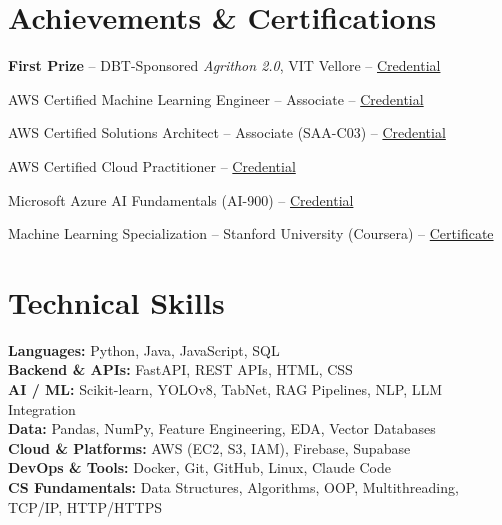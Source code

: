 \documentclass[letterpaper,10.5pt]{article}
\begin{document}
\section{Achievements \& Certifications}
\begin{itemize}[leftmargin=0.15in, label={}, itemsep=1pt]
\small{
\item \textbf{First Prize} -- DBT-Sponsored \textit{Agrithon 2.0}, VIT Vellore -- \href{https://drive.google.com/file/d/12WI3zcQ_F4nXMRPHarrw1WI0uNkJj36C/view?usp=sharing}{Credential}
\item AWS Certified Machine Learning Engineer -- Associate -- \href{https://www.credly.com/badges/0ad4ecf8-45d0-438b-80ff-40d844e00556/public_url}{Credential}
\item AWS Certified Solutions Architect -- Associate (SAA-C03) -- \href{https://www.credly.com/badges/f464bb37-b9c3-4797-a5a9-1394163c2cb1/public_url}{Credential}
\item AWS Certified Cloud Practitioner -- \href{https://www.credly.com/badges/4b11c745-20e2-41c8-b481-8e084f991dba}{Credential}
\item Microsoft Azure AI Fundamentals (AI-900) -- \href{https://learn.microsoft.com/en-us/users/hariharans-2887/credentials/e15dbe931e8ce668}{Credential}
\item Machine Learning Specialization -- Stanford University (Coursera) -- \href{https://www.coursera.org/account/accomplishments/specialization/XDCVA2K1C5GX}{Certificate}
}
\end{itemize}

\section{Technical Skills}
\begin{itemize}[leftmargin=0.15in, label={}]
\small{
\item{
\textbf{Languages:} Python, Java, JavaScript, SQL \\
\textbf{Backend \& APIs:} FastAPI, REST APIs, HTML, CSS \\
\textbf{AI / ML:} Scikit-learn, YOLOv8, TabNet, RAG Pipelines, NLP, LLM Integration \\
\textbf{Data:} Pandas, NumPy, Feature Engineering, EDA, Vector Databases \\
\textbf{Cloud \& Platforms:} AWS (EC2, S3, IAM), Firebase, Supabase \\
\textbf{DevOps \& Tools:} Docker, Git, GitHub, Linux, Claude Code \\
\textbf{CS Fundamentals:} Data Structures, Algorithms, OOP, Multithreading, TCP/IP, HTTP/HTTPS
}
}
\end{itemize}
\end{document}
